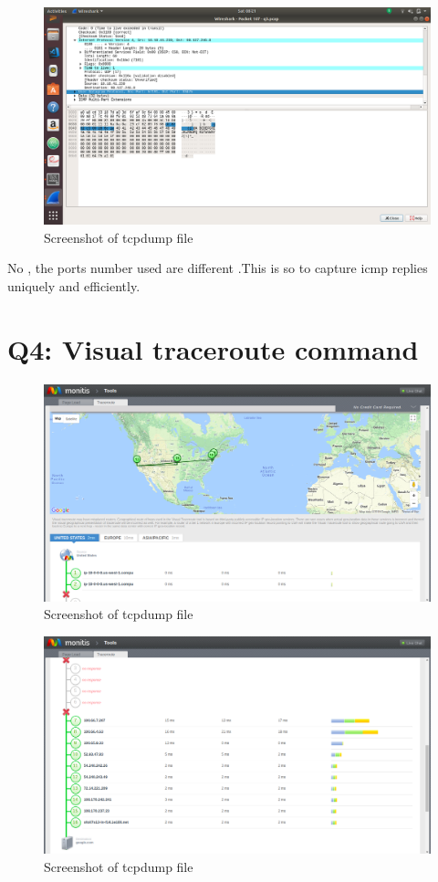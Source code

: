 \documentclass{article}
\begin{document}
  \begin{figure}[H]
 \centering
 \includegraphics[width=1.0\textwidth]{Assign3/q3/q33b.png}
 \caption{\label{fig:PING}Screenshot of tcpdump file}
 \end{figure}
 No , the ports number used are different .This is so to capture icmp replies uniquely and efficiently.
\section{Q4: Visual traceroute command}
  \begin{figure}[H]
 \centering
 \includegraphics[width=1.0\textwidth]{Assign3/q4/q4a.png}
 \caption{\label{fig:PING}Screenshot of tcpdump file}
 \end{figure}
 
   \begin{figure}[H]
 \centering
 \includegraphics[width=1.0\textwidth]{Assign3/q4/q4b.png}
 \caption{\label{fig:PING}Screenshot of tcpdump file}
 \end{figure}
\end{document}
